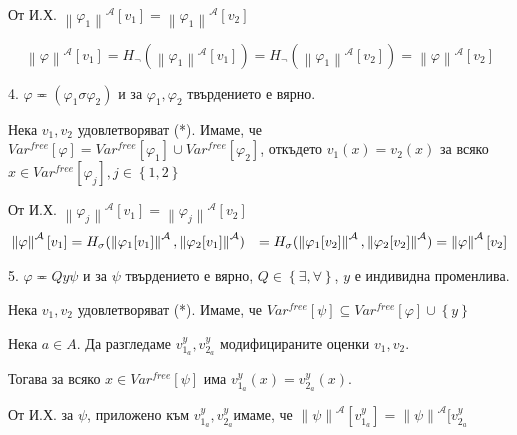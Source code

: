 \documentclass{article}
\renewcommand{\\}{\newline}
\begin{document}
От И.Х. \(\left\|\varphi_1\right\|^{\mathcal{A}}[v_1] = \left\|\varphi_1\right\|^{\mathcal{A}}[v_2]\)  

\[
  \left\|\varphi\right\|^{\mathcal{A}}[v_1] = H_{\lnot}(\left\|\varphi_1\right\|^{\mathcal{A}}[v_1]) = H_{\lnot}(\left\|\varphi_1\right\|^{\mathcal{A}}[v_2])  = \left\|\varphi\right\|^{\mathcal{A}}[v_2]
\] 

4. \(\varphi \eqcirc (\varphi_1 \sigma \varphi_2)\) и за \(\varphi_1, \varphi_2\) твърдението е вярно. 

Нека \(v_1, v_2\) удовлетворяват (*). Имаме, че \(Var^{free}[\varphi] = Var^{free}[\varphi_1] \cup Var^{free}[\varphi_2]\), откъдето \(v_1(x) = v_2(x)\) за всяко \(x \in Var^{free}[\varphi_j], j \in \left\{1, 2\right\}\)  

От И.Х. \(\left\|\varphi_j\right\|^{\mathcal{A}}[v_1] = \left\|\varphi_j\right\|^{\mathcal{A}}[v_2]\)  
\begin{align*}
  \left\|\varphi\right\|^{\mathcal{A}}[v_1] &= H_{\sigma}(\left\|\varphi_1[v_1]\right\|^{\mathcal{A}}, \left\|\varphi_2[v_1]\right\|^{\mathcal{A}})  \\
                                            &= H_{\sigma}(\left\|\varphi_1[v_2]\right\|^{\mathcal{A}}, \left\|\varphi_2[v_2]\right\|^{\mathcal{A}}) = \left\|\varphi\right\|^{\mathcal{A}}[v_2]
\end{align*}

5. \(\varphi \eqcirc Qy \psi\) и за \(\psi\) твърдението е вярно, \(Q \in \left\{\exists, \forall\right\}\), \(y\) е индивидна променлива.

Нека \(v_1, v_2\) удовлетворяват (*). Имаме, че \(Var^{free}[\psi] \subseteq Var^{free}[\varphi] \cup \left\{y\right\}\)

Нека \(a \in A\). Да разгледаме \(v_{1_a}^{y}, v_{2_a}^{y}\) модифицираните оценки \(v_1, v_2\).

Тогава за всяко \(x \in Var^{free}[\psi]\) има \(v_{1_a}^{y}(x) = v_{2_a}^{y}(x)\). 

От И.Х. за \(\psi\), приложено към  \(v_{1_a}^{y}, v_{2_a}^{y}\)имаме, че \(\left\|\psi\right\|^{\mathcal{A}}[v_{1_a}^{y}] = \left\|\psi\right\|^{\mathcal{A}}[v_{2_a}^{y}\) 
\end{document}
